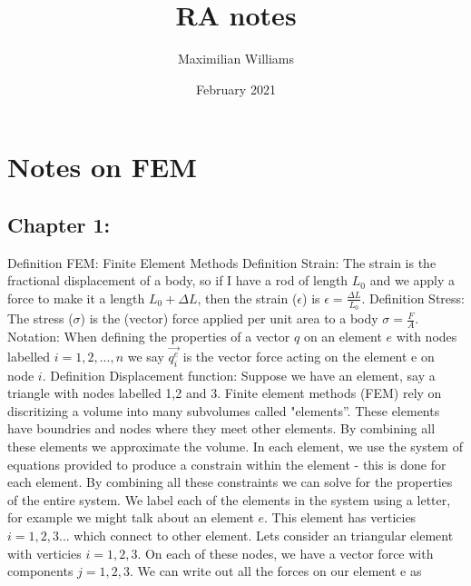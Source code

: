 \documentclass{article}
\title{RA notes}
\author{Maximilian Williams}
\date{February 2021}
\begin{document}
\maketitle

\section{Notes on FEM}

\subsection{Chapter 1:}
Definition FEM: Finite Element Methods
\newline
Definition Strain: The strain is the fractional displacement of a body, so if I have a rod of length $L_0$ and we apply a force to make it a length $L_0 + \Delta L$, then the strain ($\epsilon$) is $\epsilon = \frac{\Delta L}{L_0}$. 
\newline
Definition Stress: The stress ($\sigma$) is the (vector) force applied per unit area to a body $\sigma = \frac{F}{A}$.
\newline
Notation: When defining the properties of a vector $q$ on an element $e$ with nodes labelled $i = 1, 2, ..., n$ we say $\vec{q^{e}_{i} }$ is the vector force acting on the element e on node $i$. 
\newline
Definition Displacement function: Suppose we have an element, say a triangle with nodes labelled 1,2 and 3.
\newline
Finite element methods (FEM) rely on discritizing a volume into many subvolumes called "elements''. These elements have boundries and nodes where they meet other elements. By combining all these elements we approximate the volume. In each element, we use the system of equations provided to produce a constrain within the element - this is done for each element. By combining all these constraints we can solve for the properties of the entire system. 
\newline
We label each of the elements in the system using a letter, for example we might talk about an element $e$. This element has verticies $i=1,2,3...$ which connect to other element. Lets consider an triangular element with verticies $i=1,2,3$. On each of these nodes, we have a vector force with components $j=1,2,3$. We can write out all the forces on our element e as
\end{document}
